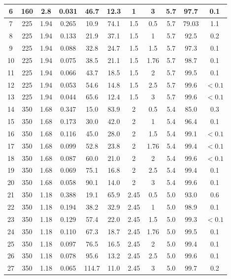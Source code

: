 \documentclass[10pt]{article}
\begin{document}
\begin{center}
\begin{tabular}{|c|c|c|c|c|c|c|c|c|c|c|}
\hline
6 & 160 & 2.8 & 0.031 & 46.7 & 12.3 & 1 & 3 & 5.7 & 97.7 & 0.1 \\
\hline
7 & 225 & 1.94 & 0.265 & 10.9 & 74.1 & 1.5 & 0.5 & 5.7 & 79.03 & 1.1 \\
\hline
8 & 225 & 1.94 & 0.133 & 21.9 & 37.1 & 1.5 & 1 & 5.7 & 92.5 & 0.2 \\
\hline
9 & 225 & 1.94 & 0.088 & 32.8 & 24.7 & 1.5 & 1.5 & 5.7 & 97.3 & 0.1 \\
\hline
10 & 225 & 1.94 & 0.075 & 38.5 & 21.1 & 1.5 & 1.76 & 5.7 & 98.7 & 0.1 \\
\hline
11 & 225 & 1.94 & 0.066 & 43.7 & 18.5 & 1.5 & 2 & 5.7 & 99.5 & 0.1 \\
\hline
12 & 225 & 1.94 & 0.053 & 54.6 & 14.8 & 1.5 & 2.5 & 5.7 & 99.6 & $<0.1$ \\
\hline
13 & 225 & 1.94 & 0.044 & 65.6 & 12.4 & 1.5 & 3 & 5.7 & 99.6 & $<0.1$ \\
\hline
14 & 350 & 1.68 & 0.347 & 15.0 & 83.9 & 2 & 0.5 & 5.4 & 85.0 & 0.3 \\
\hline
15 & 350 & 1.68 & 0.173 & 30.0 & 42.0 & 2 & 1 & 5.4 & 96.4 & 0.1 \\
\hline
16 & 350 & 1.68 & 0.116 & 45.0 & 28.0 & 2 & 1.5 & 5.4 & 99.1 & $<0.1$ \\
\hline
17 & 350 & 1.68 & 0.099 & 52.8 & 23.8 & 2 & 1.76 & 5.4 & 99.4 & $<0.1$ \\
\hline
18 & 350 & 1.68 & 0.087 & 60.0 & 21.0 & 2 & 2 & 5.4 & 99.6 & $<0.1$ \\
\hline
19 & 350 & 1.68 & 0.069 & 75.1 & 16.8 & 2 & 2.5 & 5.4 & 99.4 & 0.1 \\
\hline
20 & 350 & 1.68 & 0.058 & 90.1 & 14.0 & 2 & 3 & 5.4 & 99.6 & 0.1 \\
\hline
21 & 350 & 1.18 & 0.388 & 19.1 & 65.9 & 2.45 & 0.5 & 5.0 & 93.0 & 0.6 \\
\hline
22 & 350 & 1.18 & 0.194 & 38.2 & 32.9 & 2.45 & 1 & 5.0 & 98.9 & 0.1 \\
\hline
23 & 350 & 1.18 & 0.129 & 57.4 & 22.0 & 2.45 & 1.5 & 5.0 & 99.3 & $<0.1$ \\
\hline
24 & 350 & 1.18 & 0.110 & 67.3 & 18.7 & 2.45 & 1.76 & 5.0 & 99.5 & 0.1 \\
\hline
25 & 350 & 1.18 & 0.097 & 76.5 & 16.5 & 2.45 & 2 & 5.0 & 99.4 & 0.1 \\
\hline
26 & 350 & 1.18 & 0.078 & 95.6 & 13.2 & 2.45 & 2.5 & 5.0 & 99.6 & 0.1 \\
\hline
27 & 350 & 1.18 & 0.065 & 114.7 & 11.0 & 2.45 & 3 & 5.0 & 99.7 & 0.2 \\

\end{tabular}
\end{center}
\end{document}
